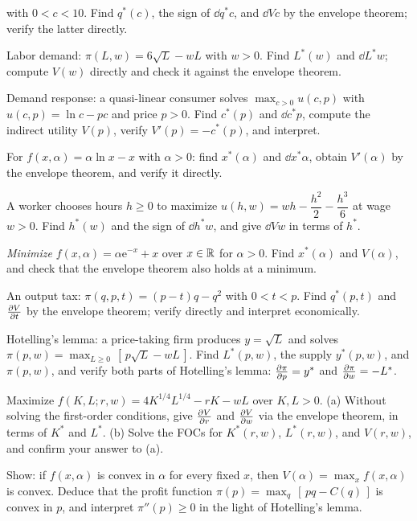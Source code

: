 \begin{problems}
        with $0<c<10$. Find $q^*(c)$, the sign of $\dd{q^*}{c}$, and
        $\dd{V}{c}$ by the envelope theorem; verify the latter directly.
  \item Labor demand: $\pi(L,w)=6\sqrt{L}-wL$ with $w>0$. Find
        $L^*(w)$ and $\dd{L^*}{w}$; compute $V(w)$ directly and check it
        against the envelope theorem.
  \item Demand response: a quasi-linear consumer solves
        $\max_{c>0} u(c,p)$ with $u(c,p)=\ln c-pc$ and price $p>0$. Find
        $c^*(p)$ and $\dd{c^*}{p}$, compute the indirect utility $V(p)$,
        verify $V'(p)=-c^*(p)$, and interpret.
  \item For $f(x,\alpha)=\alpha\ln x-x$ with $\alpha>0$: find
        $x^*(\alpha)$ and $\dd{x^*}{\alpha}$, obtain $V'(\alpha)$ by the
        envelope theorem, and verify it directly.
  \item A worker chooses hours $h\ge0$ to maximize
        $u(h,w)=wh-\dfrac{h^2}{2}-\dfrac{h^3}{6}$ at wage $w>0$. Find
        $h^*(w)$ and the sign of $\dd{h^*}{w}$, and give $\dd{V}{w}$ in
        terms of $h^*$.
  \item \emph{Minimize} $f(x,\alpha)=\alpha\mathrm{e}^{-x}+x$ over
        $x\in\mathbb{R}$ for $\alpha>0$. Find $x^*(\alpha)$ and $V(\alpha)$, and
        check that the envelope theorem also holds at a minimum.
  \item An output tax: $\pi(q,p,t)=(p-t)q-q^2$ with $0<t<p$. Find
        $q^*(p,t)$ and $\frac{\partial V}{\partial t}$ by the envelope theorem; verify
        directly and interpret economically.
  \item Hotelling's lemma: a price-taking firm produces $y=\sqrt{L}$
        and solves $\pi(p,w)=\max_{L\ge0}\,[\,p\sqrt{L}-wL\,]$. Find
        $L^*(p,w)$, the supply $y^*(p,w)$, and $\pi(p,w)$, and verify
        both parts of Hotelling's lemma: $\frac{\partial \pi}{\partial p}=y^*$ and
        $\frac{\partial \pi}{\partial w}=-L^*$.
  \item Maximize $f(K,L;r,w)=4K^{1/4}L^{1/4}-rK-wL$ over $K,L>0$.
        (a) Without solving the first-order conditions, give
        $\frac{\partial V}{\partial r}$ and $\frac{\partial V}{\partial w}$ via the envelope theorem, in terms
        of $K^*$ and $L^*$. (b) Solve the FOCs for $K^*(r,w)$,
        $L^*(r,w)$, and $V(r,w)$, and confirm your answer to (a).
  \item Show: if $f(x,\alpha)$ is convex in $\alpha$ for every fixed
        $x$, then $V(\alpha)=\max_x f(x,\alpha)$ is convex. Deduce that
        the profit function $\pi(p)=\max_q\,[\,pq-C(q)\,]$ is convex in
        $p$, and interpret $\pi''(p)\ge0$ in the light of Hotelling's
        lemma.
\end{problems}

